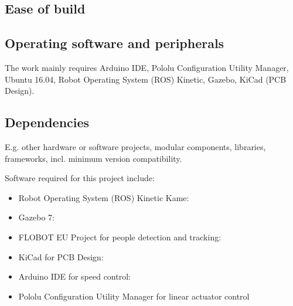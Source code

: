 \documentclass[a4paper]{article}
\begin{document}


\subsection{Ease of build}\label{h.wg823sgyb1e4}



\subsection{Operating software and peripherals}\label{h.uz77dixfh5i4}



The work mainly requires Arduino IDE, Pololu Configuration Utility Manager, Ubuntu 16.04, Robot Operating System (ROS) Kinetic, Gazebo, KiCad (PCB Design). 


\subsection{Dependencies}\label{h.vr0vnjs8z9ar}

E.g. other hardware or software projects, modular components,
libraries, frameworks, incl. minimum version compatibility.

Software required for this project include:
\begin{itemize}
	\item Robot Operating System (ROS) Kinetic Kame: 
	\item Gazebo 7: 
	\item FLOBOT EU Project for people detection and tracking:
	\item KiCad for PCB Design:
	\item Arduino IDE for speed control: 
	\item Pololu Configuration Utility Manager for linear actuator control
\end{itemize}
\end{document}
